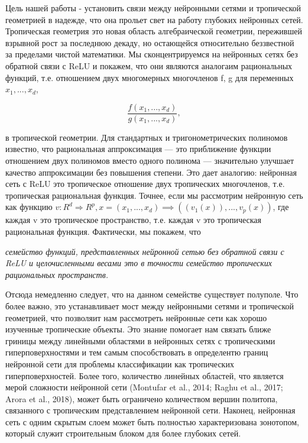 \documentclass[russian]{lecture-notes}
\begin{document}
	Цель нашей работы - установить связи между нейронными сетями и тропической геометрией в надежде, что она прольет свет на работу глубоких нейронных сетей. Тропическая геометрия это новая область алгебраической геометрии, пережившей взрывной рост за последнюю декаду, но остающейся относительно беззвестной за пределами чистой математики. Мы сконцентрируемся на нейронных сетях без обратной связи с ReLU и покажем, что они являются аналогаим рациональных функций, т.е. отношением двух многомерных многочленов f, g для переменных $x_1,...,x_d$,
	
	\begin{equation*}
	\frac{f(x_1,...,x_d)}{g(x_1,...,x_d)},
	\end{equation*}
	
	в тропической геометрии. Для стандартных и тригонометрических полиномов известно, что рациональная аппроксимация --- это приближение функции отношением двух полиномов вместо одного полинома --- значительно улучшает качество аппроксимации без повышения степени. Это дает аналогию: нейронная сеть с ReLU это тропическое отношение двух тропических многочленов, т.е. тропическая рациональная функция. Точнее, если мы рассмотрим нейронную сеть как функцию $v : R^d \Rightarrow R^p, x=(x_1,...,x_d) \implies ((v_1(x)),...,v_p(x))$, где каждая v это тропическое пространство, т.е. каждая v это тропическая рациональная функция. Фактически, мы покажем, что
	
	
	\textit{семейство функций, представленных нейронной сетью без обратной связи с ReLU и целочисленными весами это в точности семейство тропических рациональных пространств.}
	
	Отсюда немедленно следует, что на данном семействе существует полуполе. Что более важно, это устанавливает мост между нейронными сетями и тропической геометрией, что позволяит нам рассмотреть нейронные сети как хорошо изученные тропические объекты. Это знание помогает нам связать ближе гриницы между линейными областями в нейронных сетях с тропическими гиперповерхностями и тем самым способствовать в определентю границ нейронной сети для проблемы классификации как тропических гиперповерхностей. Более того, количество линейных областей, что является мерой сложности нейронной сети (Montufar et al., 2014; Raghu et al., 2017; Arora
	et al., 2018), может быть ограничено количеством вершин политопа, связанного с тропическим представлением нейронной сети. Наконец, нейронная сеть с одним скрытым слоем может быть полностью характеризована зонотопом, который служит строительным блоком для более глубоких сетей.
	
\end{document}
